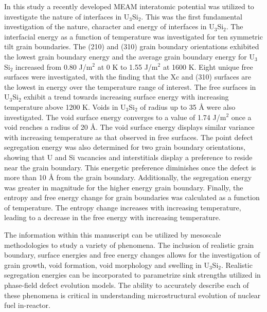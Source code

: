 \documentclass[review]{elsarticle}
\begin{document}
In this study a recently developed MEAM interatomic potential was utilized to investigate the nature of interfaces in U$_{3}$Si$_{2}$. This was the first fundamental investigation of the nature, character and energy of interfaces in U$_{3}$Si$_{2}$. The interfacial energy as a function of temperature was investigated for ten symmetric tilt grain boundaries. The (210) and (310) grain boundary orientations exhibited the lowest grain boundary energy and the average grain boundary energy for U$_{3}$Si$_{2}$ increased from 0.80 J/m$^{2}$ at 0 K to 1.55 J/m$^{2}$ at 1600 K. Eight unique free surfaces were investigated, with the finding that the Xc and (310) surfaces are the lowest in energy over the temperature range of interest. The free surfaces in U$_{3}$Si${_2}$ exhibit a trend towards increasing surface energy with increasing temperature above 1200 K. Voids in U$_{3}$Si$_{2}$ of radius up to 35 {\AA} were also investigated. The void surface energy converges to a value of 1.74 J/m$^{2}$ once a void reaches a radius of 20 {\AA}. The void surface energy displays similar variance with increasing temperature as that observed in free surfaces. The point defect segregation energy was also determined for two grain boundary orientations, showing that U and Si vacancies and interstitials display a preference to reside near the grain boundary. This energetic preference diminishes once the defect is more than 10 {\AA} from the grain boundary. Additionally, the segregation energy was greater in magnitude for the higher energy grain boundary. Finally, the entropy and free energy change for grain boundaries was calculated as a function of temperature. The entropy change increases with increasing temperature, leading to a decrease in the free energy with increasing temperature. 

The information within this manuscript can be utilized by mesoscale methodologies to study a variety of phenomena. The inclusion of realistic grain boundary, surface energies and free energy changes allows for the investigation of grain growth, void formation, void morphology and swelling in U$_{3}$Si$_{2}$. Realistic segregation energies can be incorporated to parametrize sink strengths utilized in phase-field defect evolution models. The ability to accurately describe each of these phenomena is critical in understanding microstructural evolution of nuclear fuel in-reactor. 
\end{document}
